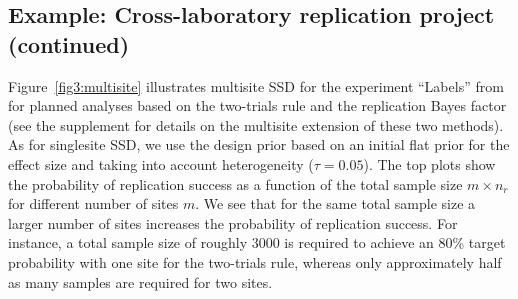 \subsection{Example: Cross-laboratory replication project (continued)}
Figure~\ref{fig3:multisite} illustrates multisite SSD for the experiment
``Labels'' from \citet{Protzko2020} for planned analyses based on the
two-trials rule and the replication Bayes factor (see the supplement for details
on the multisite extension of these two methods). As for singlesite SSD, we use
the design prior based on an initial flat prior for the effect size and taking
into account heterogeneity ($\tau = 0.05$). The top
plots show the probability of replication success as a function of the total
sample size $m \times n_{r}$ for different number of sites $m$. We see that for
the same total sample size a larger number of sites increases the probability of
replication success. For instance, a total sample size of roughly 3000 is
required to achieve an 80\% target probability with one site %
for the two-trials rule, whereas only approximately half as many samples are
required for two sites. %


